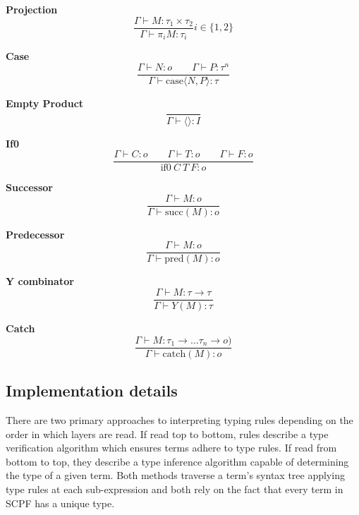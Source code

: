 \documentclass[12pt,a4paper]{report}
\theoremstyle{definition}
\theoremstyle{definition}
\theoremstyle{remark}
\begin{document}
\textbf{Projection}
\begin{equation}
    \frac{\Gamma \vdash M:\tau_1 \times \tau_2}{\Gamma \vdash \pi_i M: \tau_i} i \in \{1, 2\}
\end{equation}

\textbf{Case}
\begin{equation}
    \frac{\Gamma \vdash N : o \quad\quad \Gamma \vdash P : \tau^{n}}{\Gamma \vdash \text{case}\langle N, P \rangle : \tau}
\end{equation}

\textbf{Empty Product}
\begin{equation}
    \frac{}{\Gamma \vdash \langle \rangle : I}
\end{equation}

\textbf{If0}
\begin{equation}
    \frac{\Gamma \vdash C : o \quad\quad \Gamma \vdash T : o \quad\quad \Gamma \vdash F : o}{\text{if0}\ C\ T\ F : o}
\end{equation}

\textbf{Successor}
\begin{equation}
    \frac{\Gamma \vdash M:o}{\Gamma \vdash \text{succ}(M) : o}
\end{equation}

\textbf{Predecessor}
\begin{equation}
    \frac{\Gamma \vdash M:o}{\Gamma \vdash \text{pred}(M) : o}
\end{equation}

\textbf{Y combinator}
\begin{equation}
    \frac{\Gamma \vdash M : \tau \rightarrow \tau}{\Gamma \vdash Y(M) : \tau}
\end{equation}

\textbf{Catch}
\begin{equation}
    \frac{\Gamma \vdash M : \tau_1 \rightarrow \dots \tau_n \rightarrow o)}{\Gamma \vdash \text{catch}(M) : o}
\end{equation}

\subsection{Implementation details} 
There are two primary approaches to interpreting typing rules depending on the order in which layers are read. If read top to bottom, rules describe a type verification algorithm which ensures terms adhere to type rules. If read from bottom to top, they describe a type inference algorithm capable of determining the type of a given term. Both methods traverse a term's syntax tree applying type rules at each sub-expression and both rely on the fact that every term in SCPF has a unique type.
\end{document}
